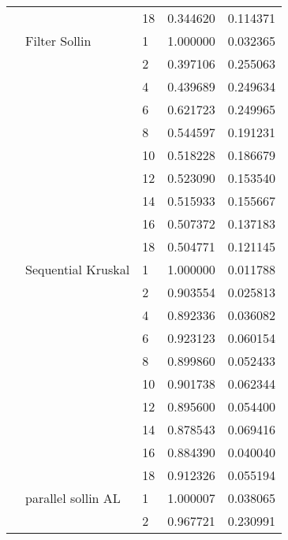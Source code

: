 \begin{tabular}{lllrr}
                      &                     & 18 &  0.344620 &  0.114371 \\
                      & Filter Sollin & 1  &  1.000000 &  0.032365 \\
                      &                     & 2  &  0.397106 &  0.255063 \\
                      &                     & 4  &  0.439689 &  0.249634 \\
                      &                     & 6  &  0.621723 &  0.249965 \\
                      &                     & 8  &  0.544597 &  0.191231 \\
                      &                     & 10 &  0.518228 &  0.186679 \\
                      &                     & 12 &  0.523090 &  0.153540 \\
                      &                     & 14 &  0.515933 &  0.155667 \\
                      &                     & 16 &  0.507372 &  0.137183 \\
                      &                     & 18 &  0.504771 &  0.121145 \\
                      & Sequential Kruskal & 1  &  1.000000 &  0.011788 \\
                      &                     & 2  &  0.903554 &  0.025813 \\
                      &                     & 4  &  0.892336 &  0.036082 \\
                      &                     & 6  &  0.923123 &  0.060154 \\
                      &                     & 8  &  0.899860 &  0.052433 \\
                      &                     & 10 &  0.901738 &  0.062344 \\
                      &                     & 12 &  0.895600 &  0.054400 \\
                      &                     & 14 &  0.878543 &  0.069416 \\
                      &                     & 16 &  0.884390 &  0.040040 \\
                      &                     & 18 &  0.912326 &  0.055194 \\
                      & parallel sollin AL & 1  &  1.000007 &  0.038065 \\
                      &                     & 2  &  0.967721 &  0.230991 \\

\end{tabular}
